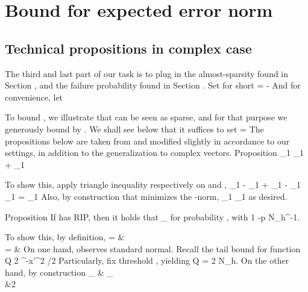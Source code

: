 \section {Bound for expected error norm}

\subsection {Technical propositions in complex case}

The third and last part of our task is to plug in the almost-sparsity found in Section , and the failure probability found in Section .
Set for short
%
 {
=  -  
}
%
And for convenience, let

%
To bound , we illustrate that  can be seen as sparse, and for that purpose we generously bound  by .
We shall see below that it suffices to set
%
 {
\g
=  
}
%
The propositions below are taken from \cite {CaT07} and modified slightly in accordance to our settings, in addition to the generalization to complex vectors.
%
\Result
{Proposition}
{
%
 {
 _1
\leq {} _1
+ _1 
}
}

To show this, apply triangle inequality respectively on  and ,
%
 {
 _1
-  _1
+  _1
-  _1
\leq {} _1
%
= _1 
}
%
Also, by construction that  minimizes the -norm,
%
 {
 _1
\leq {} _1 
}
as desired.

%
\Result
{Proposition}
{
If  has  RIP, then it holds that
%
 {
 _\infty
{}  
}
%
for probability , with
%
 {
1 -p
\leq N_h^{-1}.
}
}

To show this, by definition,
%
 {
= & \notag \\
%
= & 
}
%
On one hand,  observes standard normal.
Recall the tail bound for  function
%
 {
Q
\leq {} {2} ^{-x'^2 /2} 
}
%
Particularly, fix threshold , yielding
%
 {
Q
= {2 N_h}. 
}
%
On the other hand, by construction
%
 {
 _\infty
\leq & _\infty \notag \\
%
\leq &2 
}

